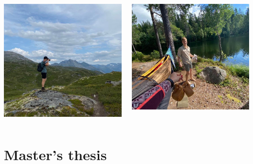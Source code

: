 \documentclass[
	10pt, %
]{beamer}
\begin{document}
\begin{frame}
\begin{columns}
		\begin{minipage}[c][0.4\textheight][c]{\linewidth}
		  \centering  
		  \includegraphics[width=0.75\linewidth]{figures/photography.jpg}
		\end{minipage}  
		\begin{minipage}[c][0.4\textheight][c]{\linewidth}
		  \centering  
		  \includegraphics[width=0.75\linewidth]{figures/camping.jpg}
		\end{minipage}  



		\end{columns}
		\end{frame}
		
\section{Master's thesis}
\end{document}
